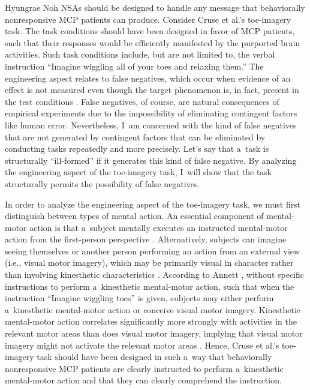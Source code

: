 \begin{artengenv}{Hyungrae Noh}
NSAs should be designed to handle any message that behaviorally nonresponsive MCP patients can produce. Consider Cruse et al.'s
\parencite*[][]{cruse_bedside_2011} %
 toe-imagery task. The task conditions should have been designed in favor of MCP patients, such that their responses would be efficiently manifested by the purported brain activities. Such task conditions include, but are not limited to, the verbal instruction ``Imagine wiggling all of your toes and relaxing them.'' The engineering aspect relates to false negatives, which occur when evidence of an effect is not measured even though the target phenomenon is, in fact, present in the test conditions 
\parencite[][p.591]{peterson_risk_2015}. %
 False negatives, of course, are natural consequences of empirical experiments due to the impossibility of eliminating contingent factors like human error. Nevertheless, I~am concerned with the kind of false negatives that are not generated by contingent factors that can be eliminated by conducting tasks repeatedly and more precisely. Let's say that a~task is structurally ``ill-formed'' if it generates this kind of false negative. By analyzing the engineering aspect of the toe-imagery task, I~will show that the task structurally permits the possibility of false negatives.

In order to analyze the engineering aspect of the toe-imagery task, we must first distinguish between types of mental action. An essential component of mental-motor action is that a~subject mentally executes an instructed mental-motor action from the first-person perspective
\parencite[i.e., kinesthetic mental-motor action;][]{ehrsson_imagery_2003}. %
 Alternatively, subjects can imagine seeing themselves or another person performing an action from an external view (i.e., visual motor imagery), which may be primarily visual in character rather than involving kinesthetic characteristics 
\parencite[][]{sekiyama_mental_1983}. %
 According to Annett 
\parencite*[][]{annett_motor_1995}, %
 without specific instructions to perform a~kinesthetic mental-motor action, such that when the instruction ``Imagine wiggling toes'' is given, subjects may either perform a~kinesthetic mental-motor action or conceive visual motor imagery. Kinesthetic mental-motor action correlates significantly more strongly with activities in the relevant motor areas than does visual motor imagery, implying that visual motor imagery might not activate the relevant motor areas 
\parencite[][]{neuper_imagery_2005}. %
 Hence, Cruse et al.'s toe-imagery task should have been designed in such a~way that behaviorally nonresponsive MCP patients are clearly instructed to perform a~kinesthetic mental-motor action and that they can clearly comprehend the instruction.


\end{artengenv}
